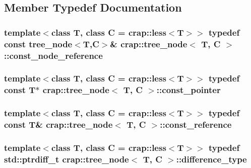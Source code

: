 \subsection{Member Typedef Documentation}
\hypertarget{structcrap_1_1tree__node_aee045bffc92fd3f1d7abc88408b6c582}{
\subsubsection[{const\-\_\-node\-\_\-reference}]{\setlength{\rightskip}{0pt plus 5cm}template$<$class T, class C = crap\-::less$<$\-T$>$$>$ typedef const {\bf tree\-\_\-node}$<$T,C$>$\& {\bf crap\-::tree\-\_\-node}$<$ T, C $>$\-::{\bf const\-\_\-node\-\_\-reference}}}\label{structcrap_1_1tree__node_aee045bffc92fd3f1d7abc88408b6c582}
\hypertarget{structcrap_1_1tree__node_a7fec5a80c64002e88a4dd86cbbfa415c}{
\subsubsection[{const\-\_\-pointer}]{\setlength{\rightskip}{0pt plus 5cm}template$<$class T, class C = crap\-::less$<$\-T$>$$>$ typedef const T$\ast$ {\bf crap\-::tree\-\_\-node}$<$ T, C $>$\-::{\bf const\-\_\-pointer}}}\label{structcrap_1_1tree__node_a7fec5a80c64002e88a4dd86cbbfa415c}
\hypertarget{structcrap_1_1tree__node_aba72ea30a111f70d4c877614b845289f}{
\subsubsection[{const\-\_\-reference}]{\setlength{\rightskip}{0pt plus 5cm}template$<$class T, class C = crap\-::less$<$\-T$>$$>$ typedef const T\& {\bf crap\-::tree\-\_\-node}$<$ T, C $>$\-::{\bf const\-\_\-reference}}}\label{structcrap_1_1tree__node_aba72ea30a111f70d4c877614b845289f}
\hypertarget{structcrap_1_1tree__node_a80b30e058eb9e13c85e6fcbc4e37d74e}{
\subsubsection[{difference\-\_\-type}]{\setlength{\rightskip}{0pt plus 5cm}template$<$class T, class C = crap\-::less$<$\-T$>$$>$ typedef std\-::ptrdiff\-\_\-t {\bf crap\-::tree\-\_\-node}$<$ T, C $>$\-::{\bf difference\-\_\-type}}}\label{structcrap_1_1tree__node_a80b30e058eb9e13c85e6fcbc4e37d74e}
